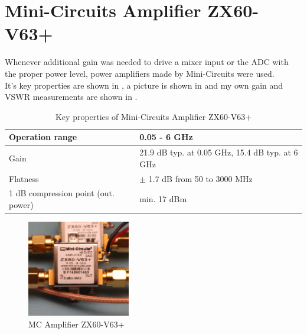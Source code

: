 \section{Mini-Circuits Amplifier ZX60-V63+}
Whenever additional gain was needed to drive a mixer input or the \gls{ADC}
with the proper power level, power amplifiers made by Mini-Circuits were used. \\

It's key properties are shown in , a picture is shown in
 and my own gain and \gls{VSWR} measurements are shown in
. \\

\begin{table}[h]
  \centering
  \begin{tabular}{|l|l|}
    \hline
    Operation range & 0.05 - 6 GHz \\ \hline
    Gain & 21.9 dB typ. at 0.05 GHz, 15.4 dB typ. at 6 GHz \\ \hline
    Flatness & $\pm$ 1.7 dB from 50 to 3000 MHz \\ \hline
    1 dB compression point (out. power) & min. 17 dBm \\ \hline
  \end{tabular}
  \caption{Key properties of Mini-Circuits Amplifier ZX60-V63+ \cite{mc_zx60}}
  \label{tab:comp_zx60}
\end{table}

\begin{figure}[p]
  \centering
  \includegraphics[width=0.4\textwidth]{pictures/ZX60-V63+}
  \caption{\gls{MC} Amplifier ZX60-V63+}
  \label{fig:comp_zx60_pic}
\end{figure}

